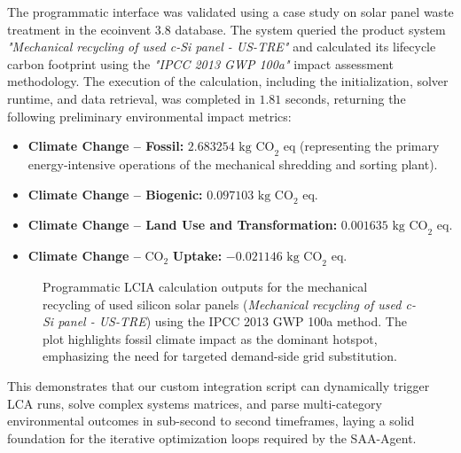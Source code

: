 \documentclass[11pt]{article}
\begin{document}
The programmatic interface was validated using a case study on solar panel waste treatment in the ecoinvent 3.8 database. The system queried the product system \textit{"Mechanical recycling of used c-Si panel - US-TRE"} and calculated its lifecycle carbon footprint using the \textit{"IPCC 2013 GWP 100a"} impact assessment methodology. The execution of the calculation, including the initialization, solver runtime, and data retrieval, was completed in $1.81$ seconds, returning the following preliminary environmental impact metrics:
\begin{itemize}
    \item \textbf{Climate Change -- Fossil:} $2.683254\text{ kg CO}_2\text{ eq}$ (representing the primary energy-intensive operations of the mechanical shredding and sorting plant).
    \item \textbf{Climate Change -- Biogenic:} $0.097103\text{ kg CO}_2\text{ eq}$.
    \item \textbf{Climate Change -- Land Use and Transformation:} $0.001635\text{ kg CO}_2\text{ eq}$.
    \item \textbf{Climate Change -- }$\text{CO}_2$\textbf{ Uptake:} $-0.021146\text{ kg CO}_2\text{ eq}$.
\end{itemize}

\begin{figure}[htbp]
    \centering
    \caption{Programmatic LCIA calculation outputs for the mechanical recycling of used silicon solar panels (\textit{Mechanical recycling of used c-Si panel - US-TRE}) using the IPCC 2013 GWP 100a method. The plot highlights fossil climate impact as the dominant hotspot, emphasizing the need for targeted demand-side grid substitution.}
    \label{fig:prelim_lca_results}
\end{figure}
This demonstrates that our custom integration script can dynamically trigger LCA runs, solve complex systems matrices, and parse multi-category environmental outcomes in sub-second to second timeframes, laying a solid foundation for the iterative optimization loops required by the SAA-Agent.
\end{document}
